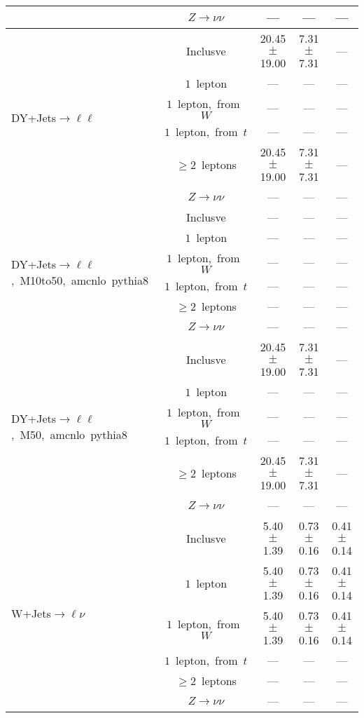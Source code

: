 \documentclass{article}
\begin{document}
\begin{longtable}{|l|c|c|c|c|}
 & $Z\rightarrow\nu\nu$  & ---  & ---  & --- \\* 
\hline 
\multirow{6}{*}{DY+Jets$\rightarrow\ell\ell$} & Inclusve  & 20.45 $\pm$ 19.00  & 7.31 $\pm$ 7.31  & --- \\* 
 & $1$~lepton  & ---  & ---  & --- \\* 
 & $1$~lepton,~from~$W$  & ---  & ---  & --- \\* 
 & $1$~lepton,~from~$t$  & ---  & ---  & --- \\* 
 & $\ge2$~leptons  & 20.45 $\pm$ 19.00  & 7.31 $\pm$ 7.31  & --- \\* 
 & $Z\rightarrow\nu\nu$  & ---  & ---  & --- \\* 
\hline 
\multirow{6}{*}{DY+Jets$\rightarrow\ell\ell$,~M10to50,~amcnlo~pythia8} & Inclusve  & ---  & ---  & --- \\* 
 & $1$~lepton  & ---  & ---  & --- \\* 
 & $1$~lepton,~from~$W$  & ---  & ---  & --- \\* 
 & $1$~lepton,~from~$t$  & ---  & ---  & --- \\* 
 & $\ge2$~leptons  & ---  & ---  & --- \\* 
 & $Z\rightarrow\nu\nu$  & ---  & ---  & --- \\* 
\hline 
\multirow{6}{*}{DY+Jets$\rightarrow\ell\ell$,~M50,~amcnlo~pythia8} & Inclusve  & 20.45 $\pm$ 19.00  & 7.31 $\pm$ 7.31  & --- \\* 
 & $1$~lepton  & ---  & ---  & --- \\* 
 & $1$~lepton,~from~$W$  & ---  & ---  & --- \\* 
 & $1$~lepton,~from~$t$  & ---  & ---  & --- \\* 
 & $\ge2$~leptons  & 20.45 $\pm$ 19.00  & 7.31 $\pm$ 7.31  & --- \\* 
 & $Z\rightarrow\nu\nu$  & ---  & ---  & --- \\* 
\hline 
\multirow{6}{*}{W+Jets$\rightarrow\ell\nu$} & Inclusve  & 5.40 $\pm$ 1.39  & 0.73 $\pm$ 0.16  & 0.41 $\pm$ 0.14 \\* 
 & $1$~lepton  & 5.40 $\pm$ 1.39  & 0.73 $\pm$ 0.16  & 0.41 $\pm$ 0.14 \\* 
 & $1$~lepton,~from~$W$  & 5.40 $\pm$ 1.39  & 0.73 $\pm$ 0.16  & 0.41 $\pm$ 0.14 \\* 
 & $1$~lepton,~from~$t$  & ---  & ---  & --- \\* 
 & $\ge2$~leptons  & ---  & ---  & --- \\* 
 & $Z\rightarrow\nu\nu$  & ---  & ---  & --- \\* 

\end{longtable}
\end{document}
